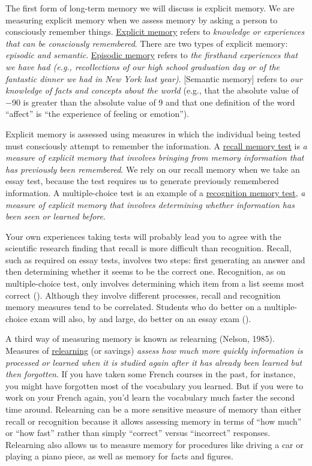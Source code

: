 \documentclass[
]{krantz}
\begin{document}
The first form of long-term memory we will discuss is explicit memory. We are measuring explicit memory when we assess memory by asking a person to consciously remember things. \hyperref[explicit-memory]{Explicit memory} refers to \emph{knowledge or experiences that can be consciously remembered}. There are two types of explicit memory: \emph{episodic and semantic}. \hyperref[episodic-memory]{Episodic memory} refers to \emph{the firsthand experiences that we have had (e.g., recollections of our high school graduation day or of the fantastic dinner we had in New York last year)}. {[}Semantic memory{]} refers to \emph{our knowledge of facts and concepts about the world} (e.g., that the absolute value of −90 is greater than the absolute value of 9 and that one definition of the word ``affect'' is ``the experience of feeling or emotion'').

Explicit memory is assessed using measures in which the individual being tested must consciously attempt to remember the information. A \hyperref[recall-memory-test]{recall memory test} is \emph{a measure of explicit memory that involves bringing from memory information that has previously been remembered}. We rely on our recall memory when we take an essay test, because the test requires us to generate previously remembered information. A multiple-choice test is an example of a \hyperref[recognition-memory-test]{recognition memory test}, \emph{a measure of explicit memory that involves determining whether information has been seen or learned before}.

Your own experiences taking tests will probably lead you to agree with the scientific research finding that recall is more difficult than recognition. Recall, such as required on essay tests, involves two steps: first generating an answer and then determining whether it seems to be the correct one. Recognition, as on multiple-choice test, only involves determining which item from a list seems most correct (). Although they involve different processes, recall and recognition memory measures tend to be correlated. Students who do better on a multiple-choice exam will also, by and large, do better on an essay exam ().

A third way of measuring memory is known as relearning (Nelson, 1985). Measures of \hyperref[relearning]{relearning} (or savings) \emph{assess how much more quickly information is processed or learned when it is studied again after it has already been learned but then forgotten}. If you have taken some French courses in the past, for instance, you might have forgotten most of the vocabulary you learned. But if you were to work on your French again, you'd learn the vocabulary much faster the second time around. Relearning can be a more sensitive measure of memory than either recall or recognition because it allows assessing memory in terms of ``how much'' or ``how fast'' rather than simply ``correct'' versus ``incorrect'' responses. Relearning also allows us to measure memory for procedures like driving a car or playing a piano piece, as well as memory for facts and figures.
\end{document}
